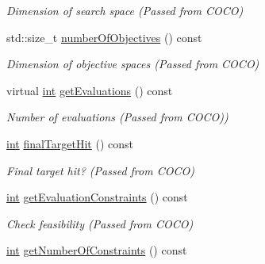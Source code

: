 \begin{DoxyCompactItemize}
\begin{DoxyCompactList}\small\item\em Dimension of search space (Passed from C\+O\+CO) \end{DoxyCompactList}\item 
std\+::size\+\_\+t \hyperlink{classCOCOfunc_a0d46ada22e366ec1b13a69049d44677b}{number\+Of\+Objectives} () const\hypertarget{classCOCOfunc_a0d46ada22e366ec1b13a69049d44677b}{}\label{classCOCOfunc_a0d46ada22e366ec1b13a69049d44677b}

\begin{DoxyCompactList}\small\item\em Dimension of objective spaces (Passed from C\+O\+CO) \end{DoxyCompactList}\item 
virtual \hyperlink{classint}{int} \hyperlink{classCOCOfunc_ac8770bd1d86e5c945b68a79998725d3b}{get\+Evaluations} () const\hypertarget{classCOCOfunc_ac8770bd1d86e5c945b68a79998725d3b}{}\label{classCOCOfunc_ac8770bd1d86e5c945b68a79998725d3b}

\begin{DoxyCompactList}\small\item\em Number of evaluations (Passed from C\+O\+CO)) \end{DoxyCompactList}\item 
\hyperlink{classint}{int} \hyperlink{classCOCOfunc_a0cd816c1e89961720d2aa66e69b19634}{final\+Target\+Hit} () const\hypertarget{classCOCOfunc_a0cd816c1e89961720d2aa66e69b19634}{}\label{classCOCOfunc_a0cd816c1e89961720d2aa66e69b19634}

\begin{DoxyCompactList}\small\item\em Final target hit? (Passed from C\+O\+CO) \end{DoxyCompactList}\item 
\hyperlink{classint}{int} \hyperlink{classCOCOfunc_a9b419be16b230e408030c5e57218a52d}{get\+Evaluation\+Constraints} () const\hypertarget{classCOCOfunc_a9b419be16b230e408030c5e57218a52d}{}\label{classCOCOfunc_a9b419be16b230e408030c5e57218a52d}

\begin{DoxyCompactList}\small\item\em Check feasibility (Passed from C\+O\+CO) \end{DoxyCompactList}\item 
\hyperlink{classint}{int} \hyperlink{classCOCOfunc_ab7a3f2bc6dcf4cc749af04043e74badc}{get\+Number\+Of\+Constraints} () const\hypertarget{classCOCOfunc_ab7a3f2bc6dcf4cc749af04043e74badc}{}\label{classCOCOfunc_ab7a3f2bc6dcf4cc749af04043e74badc}


\end{DoxyCompactItemize}
